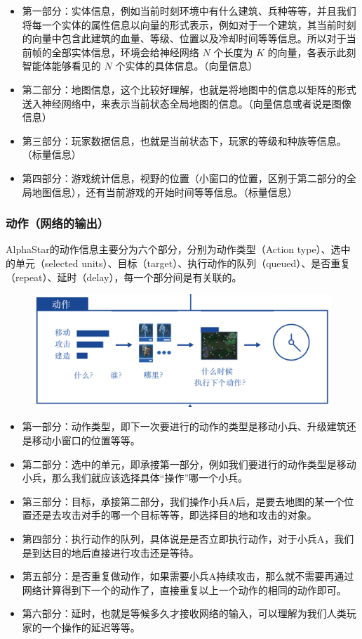 \begin{itemize}
    \item 第一部分：实体信息，例如当前时刻环境中有什么建筑、兵种等等，并且我们将每一个实体的属性信息以向量的形式表示，例如对于一个建筑，其当前时刻的向量中包含此建筑的血量、等级、位置以及冷却时间等等信息。所以对于当前帧的全部实体信息，环境会给神经网络 $N$ 个长度为 $K$ 的向量，各表示此刻智能体能够看见的 $N$ 个实体的具体信息。（向量信息）
    \item 第二部分：地图信息，这个比较好理解，也就是将地图中的信息以矩阵的形式送入神经网络中，来表示当前状态全局地图的信息。（向量信息或者说是图像信息）
    \item 第三部分：玩家数据信息，也就是当前状态下，玩家的等级和种族等信息。（标量信息）
    \item 第四部分：游戏统计信息，视野的位置（小窗口的位置，区别于第二部分的全局地图信息），还有当前游戏的开始时间等等信息。（标量信息）
\end{itemize}

\subsubsection{动作（网络的输出）} 

AlphaStar的动作信息主要分为六个部分，分别为动作类型（Action type）、选中的单元（selected units）、目标（target）、执行动作的队列（queued）、是否重复（repeat）、延时（delay），每一个部分间是有关联的。


\begin{figure}[htpb]
    \centering
    \includegraphics[width=0.7\linewidth]{res/ch13/13.2}
    \caption{}
    \label{fig:}
\end{figure}

\begin{itemize}
    \item 第一部分：动作类型，即下一次要进行的动作的类型是移动小兵、升级建筑还是移动小窗口的位置等等。
    \item 第二部分：选中的单元，即承接第一部分，例如我们要进行的动作类型是移动小兵，那么我们就应该选择具体“操作”哪一个小兵。
    \item 第三部分：目标，承接第二部分，我们操作小兵A后，是要去地图的某一个位置还是去攻击对手的哪一个目标等等，即选择目的地和攻击的对象。
    \item 第四部分：执行动作的队列，具体说是是否立即执行动作，对于小兵A，我们是到达目的地后直接进行攻击还是等待。
    \item 第五部分：是否重复做动作，如果需要小兵A持续攻击，那么就不需要再通过网络计算得到下一个的动作了，直接重复以上一个动作的相同的动作即可。
    \item 第六部分：延时，也就是等候多久才接收网络的输入，可以理解为我们人类玩家的一个操作的延迟等等。
\end{itemize}


